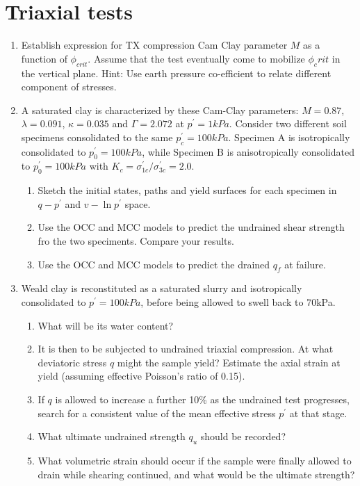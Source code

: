\documentclass[a4paper,12pt]{article}
\begin{document}
\section{Triaxial tests}
\begin{enumerate}
	\item Establish expression for TX compression Cam Clay parameter $M$ as a function of $\phi_{crit}$. Assume that the test eventually come to mobilize $\phi_crit$ in the vertical plane. Hint: Use earth pressure co-efficient to relate different component of stresses. 
	
	\item A saturated clay is characterized by these Cam-Clay parameters: $M = 0.87$, $\lambda = 0.091$, $\kappa = 0.035$ and $\Gamma = 2.072$ at $p^\prime = 1 kPa$. 
	Consider two different soil specimens consolidated to the same $p_c^\prime = 100 kPa$. Specimen A is isotropically consolidated to $p_0^\prime = 100 kPa$, while Specimen B is anisotropically consolidated to $p_0^\prime = 100 kPa$ with $K_c = \sigma_{1c}^\prime / \sigma_{3c}^\prime = 2.0$. 
	\begin{enumerate}
		\item Sketch the initial states, paths and yield surfaces for each specimen in $q-p^\prime$ and $v - \ln p^\prime$ space. 
		\item Use the OCC and MCC models to predict the undrained shear strength fro the two speciments. Compare your results.
		\item Use the OCC and MCC models to predict the drained $q_f$ at failure.
	\end{enumerate}

	\item Weald clay is reconstituted as a saturated slurry and isotropically consolidated to $p^\prime = 100kPa$, before being allowed to swell back to 70kPa.
	\begin{enumerate}
		\item What will be its water content?
		\item It is then to be subjected to undrained triaxial compression. At what deviatoric stress $q$ might the sample yield? Estimate the axial strain at yield (assuming effective Poisson's ratio of 0.15).
		\item If $q$ is allowed to increase a further 10\% as the undrained test progresses, search for a consistent value of the mean effective stress $p^\prime$ at that stage.
		\item What ultimate undrained strength $q_u$ should be recorded?
		\item What volumetric strain should occur if the sample were finally allowed to drain while
		shearing continued, and what would be the ultimate strength?
	\end{enumerate}

\end{enumerate}
\end{document}

